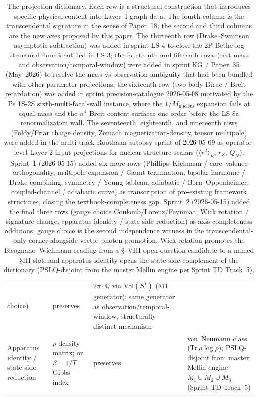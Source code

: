 \documentclass[11pt]{article}
\begin{document}
\begin{table}[h]
\begin{tabular}{p{3.5cm} p{3cm} p{2cm} p{4cm}}
choice) & preserves &
$2\pi\cdot\mathbb{Q}$ via $\mathrm{Vol}(S^1)$ (M1 generator);
same generator as observation/temporal-window, structurally distinct
mechanism \\
Apparatus identity / state-side reduction &
$\rho$ density matrix; or $\beta = 1/T$ Gibbs index & preserves &
von~Neumann class ($\mathrm{Tr}\,\rho\log\rho$); PSLQ-disjoint from
master Mellin engine $M_1\cup M_2\cup M_3$ (Sprint TD Track~5) \\
\bottomrule
\end{tabular}
\caption{The projection dictionary.  Each row is a structural
construction that introduces specific physical content into Layer~1
graph data.  The fourth column is the transcendental signature in
the sense of Paper~18; the second and third columns are the new
axes proposed by this paper.  The thirteenth row (Drake--Swainson
asymptotic subtraction) was added in sprint LS-4 to close the 2P
Bethe-log structural floor identified in LS-3; the fourteenth and
fifteenth rows (rest-mass and observation/temporal-window) were
added in sprint KG / Paper~35 (May~2026) to resolve the
mass-vs-observation ambiguity that had been bundled with other
parameter projections; the sixteenth row (two-body Dirac / Breit
retardation) was added in sprint precision-catalogue 2026-05-08
motivated by the Ps 1S-2S sixth-multi-focal-wall instance, where
the $1/M_\text{nucleus}$ expansion fails at equal mass and the
$\alpha^4$ Breit content surfaces one order before the LS-8a
renormalization wall.  The seventeenth, eighteenth, and nineteenth
rows (Foldy/Friar charge density, Zemach magnetization-density,
tensor multipole) were added in the multi-track Roothaan autopsy
sprint of 2026-05-09 as operator-level Layer-2 input projections for
nuclear-structure scalars ($\langle r^2\rangle_E$, $r_Z$, $Q_N$).
Sprint~1 (2026-05-15) added six more rows
(Phillips--Kleinman / core--valence orthogonality, multipole expansion
/ Gaunt termination, bipolar harmonic / Drake combining, symmetry /
Young tableau, adiabatic / Born--Oppenheimer, coupled-channel /
adiabatic curve) as transcription of pre-existing framework
structures, closing the textbook-completeness gap.  Sprint~2
(2026-05-15) added the final three rows (gauge choice
Coulomb/Lorenz/Feynman; Wick rotation / signature change; apparatus
identity / state-side reduction) as axis-completeness additions:
gauge choice is the second independence witness in the
transcendental-only corner alongside vector-photon promotion, Wick
rotation promotes the Bisognano--Wichmann reading from a \S~VIII
open-question candidate to a named §III slot, and apparatus identity
opens the state-side complement of the dictionary (PSLQ-disjoint
from the master Mellin engine per Sprint TD Track~5).}
\label{tab:projection_axes}
\end{table}
\end{document}
